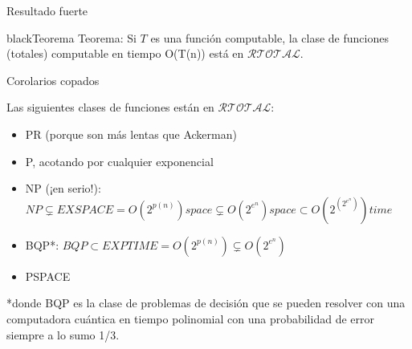 \documentclass[10pt]{beamer}
\begin{document}
\begin{frame}{Resultado fuerte}

\begin{mybox}{black}{Teorema}
	Teorema: Si $T$ es una función computable, la clase de funciones (totales) computable en tiempo O(T(n)) está en $\mathcal{RTOTAL}$.
\end{mybox}
\end{frame}


\begin{frame}{Corolarios copados}

Las siguientes clases de funciones están en $\mathcal{RTOTAL}$:

\begin{itemize}
	\item PR (porque son más lentas que Ackerman)
	\item P, acotando por cualquier exponencial
	\item NP (¡en serio!): $NP \subsetneq EXSPACE = O(2^{p(n)}) space \subsetneq O(2^{e^n}) space \subset O(2^{(2^{e^n})}) time$


	\item BQP*: $BQP \subset EXPTIME = O(2^{p(n)}) \subsetneq O(2^{e^n})$
	\item PSPACE
	\end{itemize}

	
	*donde BQP es la clase de problemas de decisión que se pueden resolver con una computadora cuántica en tiempo polinomial con una probabilidad de error siempre a lo sumo 1/3.

\end{frame}
\end{document}
